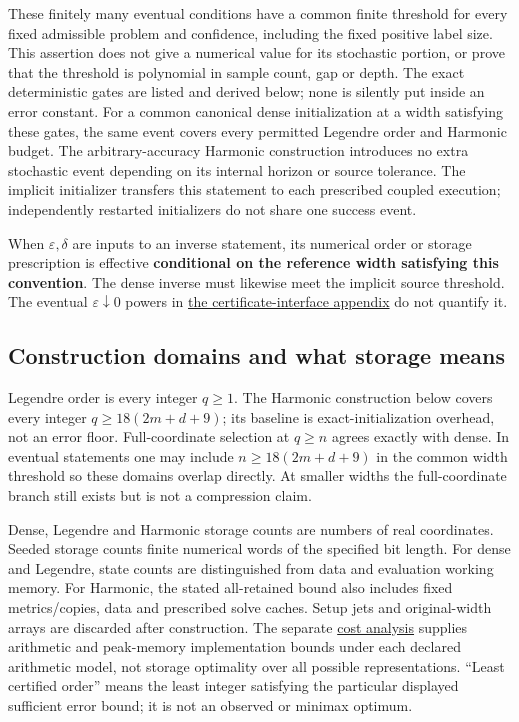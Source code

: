 
These finitely many eventual conditions have a common finite threshold for every fixed admissible problem and confidence, including the fixed positive label size. This assertion does not give a numerical value for its stochastic portion, or prove that the threshold is polynomial in sample count, gap or depth. The exact deterministic gates are listed and derived below; none is silently put inside an error constant. For a common canonical dense initialization at a width satisfying these gates, the same event covers every permitted Legendre order and Harmonic budget. The arbitrary-accuracy Harmonic construction introduces no extra stochastic event depending on its internal horizon or source tolerance. The implicit initializer transfers this statement to each prescribed coupled execution; independently restarted initializers do not share one success event.



When \(\varepsilon,\allowbreak \delta\) are inputs to an inverse statement, its numerical order or storage prescription is effective \textbf{conditional on the reference width satisfying this convention}. The dense inverse must likewise meet the implicit source threshold. The eventual \(\varepsilon\downarrow0\) powers in \hyperref[int:headline-results]{the certificate-interface appendix} do not quantify it.


\subsection{Construction domains and what storage means}



Legendre order is every integer \(q\ge1\). The Harmonic construction below covers every integer \(q\ge18(2m+d+9)\); its baseline is exact-initialization overhead, not an error floor. Full-coordinate selection at \(q\ge n\) agrees exactly with dense. In eventual statements one may include \(n\ge18(2m+d+9)\) in the common width threshold so these domains overlap directly. At smaller widths the full-coordinate branch still exists but is not a compression claim.



Dense, Legendre and Harmonic storage counts are numbers of real coordinates. Seeded storage counts finite numerical words of the specified bit length. For dense and Legendre, state counts are distinguished from data and evaluation working memory. For Harmonic, the stated all-retained bound also includes fixed metrics/copies, data and prescribed solve caches. Setup jets and original-width arrays are discarded after construction. The separate \hyperref[int:computational-costs]{cost analysis} supplies arithmetic and peak-memory implementation bounds under each declared arithmetic model, not storage optimality over all possible representations. ``Least certified order'' means the least integer satisfying the particular displayed sufficient error bound; it is not an observed or minimax optimum.


